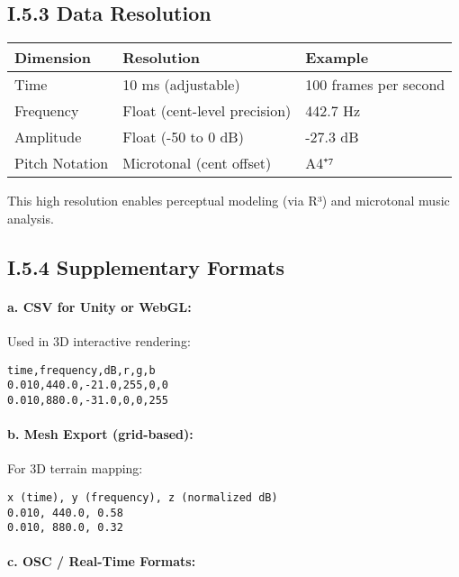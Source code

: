 \subsection*{I.5.3 Data Resolution}

\begin{center}
\begin{tabular}{|l|l|l|}
\hline
\textbf{Dimension} & \textbf{Resolution} & \textbf{Example} \\
\hline
Time & 10 ms (adjustable) & 100 frames per second \\
Frequency & Float (cent-level precision) & 442.7 Hz \\
Amplitude & Float (-50 to 0 dB) & -27.3 dB \\
Pitch Notation & Microtonal (cent offset) & A4⁺⁷ \\
\hline
\end{tabular}
\end{center}

This high resolution enables perceptual modeling (via R³) and microtonal music analysis.

\subsection*{I.5.4 Supplementary Formats}

\paragraph{a. CSV for Unity or WebGL:}

Used in 3D interactive rendering:

\begin{verbatim}
time,frequency,dB,r,g,b
0.010,440.0,-21.0,255,0,0
0.010,880.0,-31.0,0,0,255
\end{verbatim}

\paragraph{b. Mesh Export (grid-based):}

For 3D terrain mapping:

\begin{verbatim}
x (time), y (frequency), z (normalized dB)
0.010, 440.0, 0.58
0.010, 880.0, 0.32
\end{verbatim}

\paragraph{c. OSC / Real-Time Formats:}

